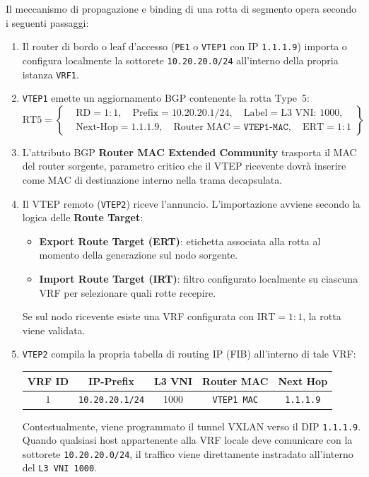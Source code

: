 \documentclass[11pt, a4paper]{article}
\begin{document}
Il meccanismo di propagazione e binding di una rotta di segmento opera secondo i seguenti passaggi:
\begin{enumerate}
    \item Il router di bordo o leaf d'accesso (\texttt{PE1} o \texttt{VTEP1} con IP \texttt{1.1.1.9}) importa o configura localmente la sottorete \texttt{10.20.20.0/24} all'interno della propria istanza \texttt{VRF1}.
    \item \texttt{VTEP1} emette un aggiornamento BGP contenente la rotta Type~5:
    \[
    \text{RT5} = \left\{
    \begin{aligned}
    &\text{RD} = 1:1, \quad \text{Prefix} = 10.20.20.1/24, \quad \text{Label} = \text{L3 VNI: } 1000, \\
    &\text{Next-Hop} = 1.1.1.9, \quad \text{Router MAC} = \texttt{VTEP1-MAC}, \quad \text{ERT} = 1:1
    \end{aligned}
    \right\}
    \]
    \item L'attributo BGP \textbf{Router MAC Extended Community} trasporta il MAC del router sorgente, parametro critico che il VTEP ricevente dovrà inserire come MAC di destinazione interno nella trama decapsulata.
    \item Il VTEP remoto (\texttt{VTEP2}) riceve l'annuncio. L'importazione avviene secondo la logica delle \textbf{Route Target}:
    \begin{itemize}[noitemsep]
        \item \textbf{Export Route Target (ERT)}: etichetta associata alla rotta al momento della generazione sul nodo sorgente.
        \item \textbf{Import Route Target (IRT)}: filtro configurato localmente su ciascuna VRF per selezionare quali rotte recepire.
    \end{itemize}
    Se sul nodo ricevente esiste una VRF configurata con $\text{IRT} = 1:1$, la rotta viene validata.
    \item \texttt{VTEP2} compila la propria tabella di routing IP (FIB) all'interno di tale VRF:
    \begin{center}
    \begin{tabular}{|c|c|c|c|c|}
    \hline
    \textbf{VRF ID} & \textbf{IP-Prefix} & \textbf{L3 VNI} & \textbf{Router MAC} & \textbf{Next Hop} \\ \hline
    $1$ & \texttt{10.20.20.1/24} & \num{1000} & \texttt{VTEP1 MAC} & \texttt{1.1.1.9} \\ \hline
    \end{tabular}
    \end{center}
    Contestualmente, viene programmato il tunnel VXLAN verso il DIP \texttt{1.1.1.9}. Quando qualsiasi host appartenente alla VRF locale deve comunicare con la sottorete \texttt{10.20.20.0/24}, il traffico viene direttamente instradato all'interno del \texttt{L3 VNI 1000}.
\end{enumerate}
\end{document}
